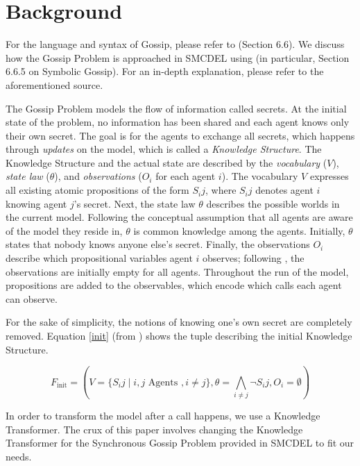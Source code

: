 \section{Background}\label{sec:Background}

For the language and syntax of Gossip, please refer to \cite{GattingerThesis2018} (Section 6.6). 
We discuss how the Gossip Problem is approached in SMCDEL using \cite{GattingerThesis2018} (in particular, Section 6.6.5 on Symbolic Gossip). 
For an in-depth explanation, please refer to the aforementioned source.

The Gossip Problem models the flow of information called secrets. 
At the initial state of the problem, no information has been shared and each agent knows only their own secret. The goal is for 
the agents to exchange all secrets, which happens through \textit{updates} on the model, which is called a \textit{Knowledge Structure}. 
The Knowledge Structure and the actual state are described by the \textit{vocabulary} ($V$), 
\textit{state law} ($\theta$), and \textit{observations} ($O_i$ for each agent $i$). The vocabulary $V$ expresses all existing atomic propositions of 
the form $S_ij$, where $S_ij$ denotes agent $i$ knowing agent $j$'s secret. 
Next, the state law $\theta$ describes the possible worlds in the current model. Following the conceptual assumption that all agents
are aware of the model they reside in, $\theta$ is common knowledge among the agents. Initially, $\theta$ states that nobody knows 
anyone else's secret. Finally, the observations $O_i$ describe which propositional 
variables agent $i$ observes; following \cite{GattingerThesis2018}, the observations are initially empty for all agents. 
Throughout the run of the model, propositions are added to the observables, which encode which calls each agent can observe.

For the sake of simplicity, the notions of knowing one's own secret are completely removed. 
Equation \ref{init} (from \cite{GattingerThesis2018}) 
shows the tuple describing the initial Knowledge Structure.

\begin{equation}
\label{init}
    F_\text{init} = (V = \{S_ij \mid i, j \text{ Agents }, i \neq j\}, \theta =\bigwedge_{i\neq j} \lnot S_ij , O_i = \emptyset)
\end{equation}

In order to transform the model after a call happens, we use a Knowledge Transformer. The crux of this paper involves changing 
the Knowledge Transformer for the Synchronous Gossip Problem provided in SMCDEL to fit our needs. 

